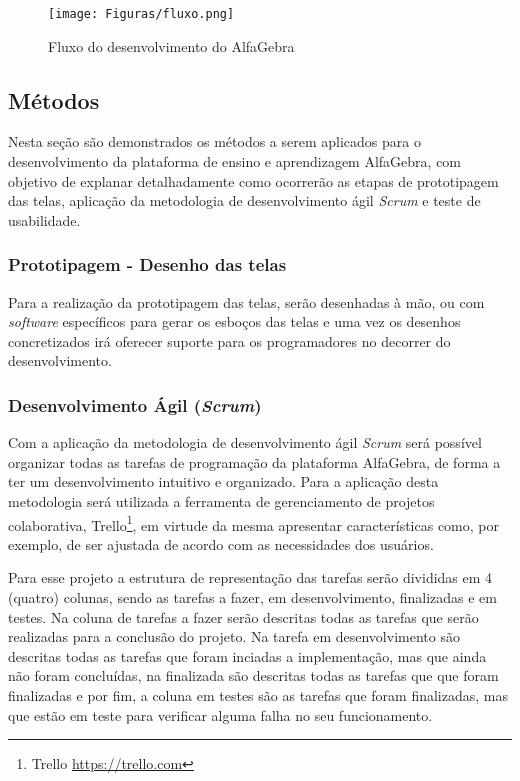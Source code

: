 \begin{figure}[!htb]
  \centering 
  \texttt{[image: Figuras/fluxo.png]}
  \caption{Fluxo do desenvolvimento do AlfaGebra}
  \label{fluxograma}
\end{figure}

\subsection{Métodos}
\noindent Nesta seção são demonstrados os métodos a serem aplicados para o desenvolvimento da plataforma de ensino e aprendizagem AlfaGebra, com objetivo de explanar detalhadamente como ocorrerão as etapas de prototipagem das telas, aplicação da metodologia de desenvolvimento ágil \textit{Scrum} e teste de usabilidade.

\subsubsection{Prototipagem - Desenho das telas}
\noindent Para a realização da prototipagem das telas, serão desenhadas à mão, ou com \textit{software} específicos para gerar os esboços das telas e uma vez os desenhos concretizados irá oferecer suporte para os programadores no decorrer do desenvolvimento. 

\subsubsection{Desenvolvimento Ágil (\textit{Scrum})}
\noindent Com a aplicação da metodologia de desenvolvimento ágil \textit{Scrum} será possível organizar todas as tarefas de programação da plataforma AlfaGebra, de forma a ter um desenvolvimento intuitivo e organizado. Para a aplicação desta metodologia será utilizada a ferramenta de gerenciamento de projetos colaborativa, Trello\footnote[11]{Trello \url{https://trello.com}}, em virtude da mesma apresentar características como, por exemplo, de ser ajustada de acordo com as necessidades dos usuários.

Para esse projeto a estrutura de representação das tarefas serão divididas em 4 (quatro) colunas, sendo as tarefas a fazer, em desenvolvimento, finalizadas e em testes. Na coluna de tarefas a fazer serão descritas todas as tarefas que serão realizadas para a conclusão do projeto. Na tarefa em desenvolvimento são descritas todas as tarefas que foram inciadas a implementação, mas que ainda não foram concluídas, na finalizada são descritas todas as tarefas que que foram finalizadas e por fim, a coluna em testes são as tarefas que foram finalizadas, mas que estão em teste para verificar alguma falha no seu funcionamento. 


